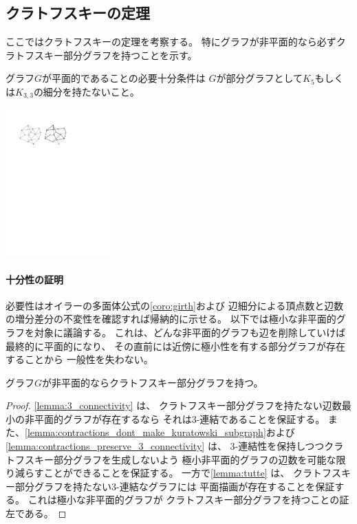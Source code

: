 \subsection{クラトフスキーの定理}
\label{subsec:kuratowski}

\begin{paracol}{2}
ここではクラトフスキーの定理を考察する。
特にグラフが非平面的なら必ずクラトフスキー部分グラフを持つことを示す。


\begin{theorem}[クラトフスキー定理]
\label{thm:kuratowski}
グラフ$G$が平面的であることの必要十分条件は
$G$が部分グラフとして$K_5$もしくは$K_{3,3}$の細分を持たないこと。
\end{theorem}

\switchcolumn
\centering
\includegraphics[width=0.3\textwidth]{figures/kuratowski_subgraph_example_01.pdf}
\end{paracol}

\paragraph{十分性の証明}
必要性はオイラーの多面体公式の\cref{coro:girth}および
辺細分による頂点数と辺数の増分差分の不変性を確認すれば帰納的に示せる。
以下では極小な非平面的グラフを対象に議論する。
これは、どんな非平面的グラフも辺を削除していけば最終的に平面的になり、
その直前には近傍に極小性を有する部分グラフが存在することから
一般性を失わない。



\begin{lemma}[クラフトスキーの定理の十分性]
グラフ$G$が非平面的ならクラトフスキー部分グラフを持つ。
\end{lemma}

\begin{proof}
\cref{lemma:3_connectivity} は、
クラトフスキー部分グラフを持たない辺数最小の非平面的グラフが存在するなら
それは$3$-連結であることを保証する。
また、\cref{lemma:contractions_dont_make_kuratowski_subgraph}および
\cref{lemma:contractions_preserve_3_connectivity} は、
$3$-連結性を保持しつつクラトフスキー部分グラフを生成しないよう
極小非平面的グラフの辺数を可能な限り減らすことができることを保証する。
一方で\cref{lemma:tutte} は、
クラトフスキー部分グラフを持たない$3$-連結なグラフには
平面描画が存在することを保証する。
これは極小な非平面的グラフが
クラトフスキー部分グラフを持つことの証左である。
\end{proof}



